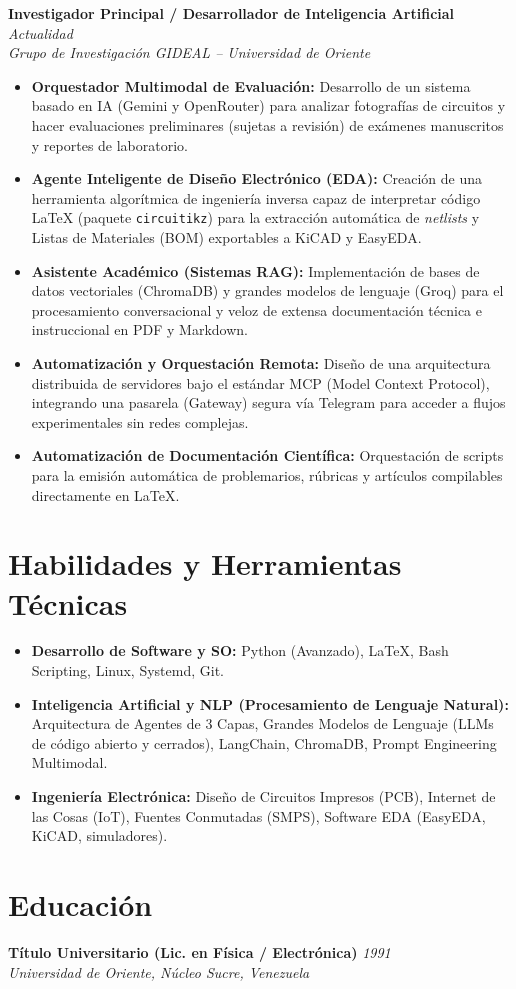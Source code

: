 \documentclass[11pt, a4paper]{article}
\begin{document}
\noindent \textbf{Investigador Principal / Desarrollador de Inteligencia Artificial} \hfill \textit{Actualidad} \\
\textit{Grupo de Investigación GIDEAL -- Universidad de Oriente}
\begin{itemize}[leftmargin=1.5em, itemsep=0.3em]
    \item \textbf{Orquestador Multimodal de Evaluación:} Desarrollo de un sistema basado en IA (Gemini y OpenRouter) para analizar fotografías de circuitos y hacer evaluaciones preliminares (sujetas a revisión) de exámenes manuscritos y reportes de laboratorio.
    \item \textbf{Agente Inteligente de Diseño Electrónico (EDA):} Creación de una herramienta algorítmica de ingeniería inversa capaz de interpretar código \LaTeX{} (paquete \texttt{circuitikz}) para la extracción automática de \textit{netlists} y Listas de Materiales (BOM) exportables a KiCAD y EasyEDA.
    \item \textbf{Asistente Académico (Sistemas RAG):} Implementación de bases de datos vectoriales (ChromaDB) y grandes modelos de lenguaje (Groq) para el procesamiento conversacional y veloz de extensa documentación técnica e instruccional en PDF y Markdown.
    \item \textbf{Automatización y Orquestación Remota:} Diseño de una arquitectura distribuida de servidores bajo el estándar MCP (Model Context Protocol), integrando una pasarela (Gateway) segura vía Telegram para acceder a flujos experimentales sin redes complejas.
    \item \textbf{Automatización de Documentación Científica:} Orquestación de scripts para la emisión automática de problemarios, rúbricas y artículos compilables directamente en \LaTeX.
\end{itemize}

\section*{Habilidades y Herramientas Técnicas}
\begin{itemize}[leftmargin=1.5em, itemsep=0.3em]
    \item \textbf{Desarrollo de Software y SO:} Python (Avanzado), \LaTeX, Bash Scripting, Linux, Systemd, Git.
    \item \textbf{Inteligencia Artificial y NLP (Procesamiento de Lenguaje Natural):} Arquitectura de Agentes de 3 Capas, Grandes Modelos de Lenguaje (LLMs de código abierto y cerrados), LangChain, ChromaDB, Prompt Engineering Multimodal.
    \item \textbf{Ingeniería Electrónica:} Diseño de Circuitos Impresos (PCB), Internet de las Cosas (IoT), Fuentes Conmutadas (SMPS), Software EDA (EasyEDA, KiCAD, simuladores).
\end{itemize}

\section*{Educación}
\noindent \textbf{Título Universitario (Lic. en Física / Electrónica)} \hfill \textit{1991} \\
\textit{Universidad de Oriente, Núcleo Sucre, Venezuela}
\end{document}
